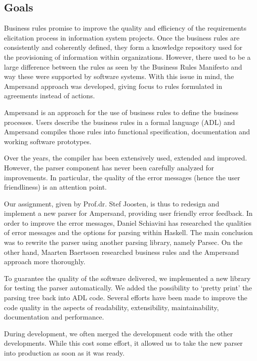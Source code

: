 
\subsection{Goals}
Business rules promise to improve the quality and efficiency of the requirements elicitation process in information system projects.
Once the business rules are consistently and coherently defined, they form a knowledge repository used for the provisioning of information within organizations.
However, there used to be a large difference between the rules as seen by the Business Rules Manifesto and way these were supported by software systems.
With this issue in mind, the Ampersand approach was developed, giving focus to rules formulated in agreements instead of actions.

Ampersand is an approach for the use of business rules to define the business processes.
Users describe the business rules in a formal language (ADL) and Ampersand compiles those rules into functional specification, documentation and working software prototypes.

Over the years, the compiler has been extensively used, extended and improved.
However, the parser component has never been carefully analyzed for improvements.
In particular, the quality of the error messages (hence the user friendliness) is an attention point.

Our assignment, given by Prof.dr. Stef Joosten, is thus to redesign and implement a new parser for Ampersand, providing user friendly error feedback.
In order to improve the error messages, Daniel Schiavini has researched the qualities of error messages and the options for parsing within Haskell.
The main conclusion was to rewrite the parser using another parsing library, namely Parsec.
On the other hand, Maarten Baertsoen researched business rules and the Ampersand approach more thoroughly.

To guarantee the quality of the software delivered, we implemented a new library for testing the parser automatically.
We added the possibility to `pretty print' the parsing tree back into ADL code.
Several efforts have been made to improve the code quality in the aspects of readability, extensibility, maintainability, documentation and performance.

During development, we often merged the development code with the other developments.
While this cost some effort, it allowed us to take the new parser into production as soon as it was ready.

